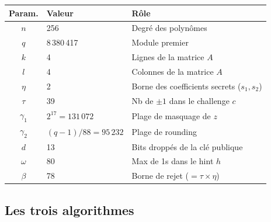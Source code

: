 \documentclass[12pt, a4paper]{article}
\begin{document}
\begin{center}
\begin{tabular}{clp{7cm}}
\toprule
\textbf{Param.} & \textbf{Valeur} & \textbf{Rôle} \\
\midrule
$n$    & 256 & Degré des polynômes \\
$q$    & 8\,380\,417 & Module premier \\
$k$    & 4 & Lignes de la matrice $A$ \\
$l$    & 4 & Colonnes de la matrice $A$ \\
$\eta$ & 2 & Borne des coefficients secrets ($s_1, s_2$) \\
$\tau$ & 39 & Nb de $\pm 1$ dans le challenge $c$ \\
$\gamma_1$ & $2^{17} = 131\,072$ & Plage de masquage de $z$ \\
$\gamma_2$ & $(q-1)/88 = 95\,232$ & Plage de rounding \\
$d$    & 13 & Bits droppés de la clé publique \\
$\omega$ & 80 & Max de 1s dans le hint $h$ \\
$\beta$ & 78 & Borne de rejet ($= \tau \times \eta$) \\
\bottomrule
\end{tabular}
\end{center}

\subsection{Les trois algorithmes}
\end{document}

